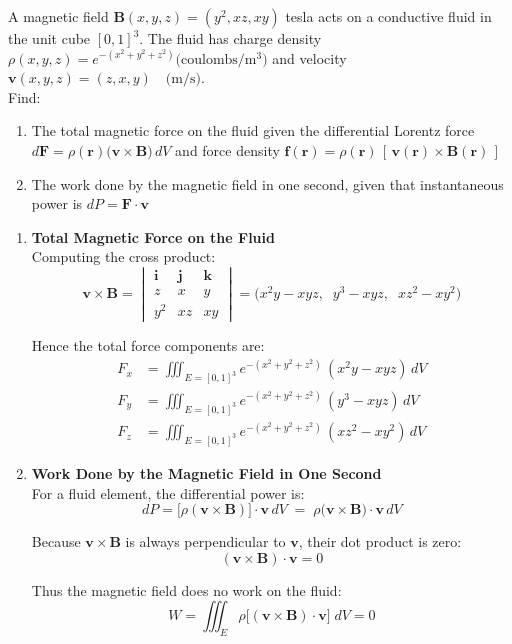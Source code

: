\exampleline
\begin{example}
A magnetic field $\mathbf{B}(x,y,z) = (y^2, xz, xy)$ tesla acts on a conductive fluid in the unit cube $[0,1]^3$. The fluid has charge density $\rho(x,y,z) = e^{-(x^2 + y^2 + z^2)}  \text{(coulombs/m$^3$)}$ and velocity $\mathbf{v}(x,y,z) = (z, x, y) \quad \text{(m/s)}$. \\

\noindent Find:
\begin{enumerate}
   \item The total magnetic force on the fluid given the differential Lorentz force $d\mathbf{F} =  \rho(\mathbf{r}) \bigl(\mathbf{v} \times \mathbf{B}\bigr)\,dV$ and force density $\mathbf{f}(\mathbf{r}) = \rho(\mathbf{r})\,[\,\mathbf{v}(\mathbf{r}) \times \mathbf{B}(\mathbf{r})\,]$
   \item The work done by the magnetic field in one second, given that instantaneous power is $dP = \mathbf{F}\cdot\mathbf{v}$
\end{enumerate}

\begin{solution}
\begin{enumerate}
   \item \textbf{Total Magnetic Force on the Fluid} \\
   
   Computing the cross product:
   \[
   \mathbf{v} \times \mathbf{B}
   =
   \begin{vmatrix}
   \mathbf{i} & \mathbf{j} & \mathbf{k}\\
   z & x & y\\
   y^2 & xz & xy
   \end{vmatrix}
   =
   \bigl(x^2y - xyz,\;\;y^3 - xyz,\;\;xz^2 - xy^2\bigr)
   \]
   
   Hence the total force components are:
   \begin{align*}
   F_x &= \iiint_{E=[0,1]^3} e^{-(x^2 + y^2 + z^2)}\,(x^2y - x y z)\, dV \\[1ex]
   F_y &= \iiint_{E=[0,1]^3} e^{-(x^2 + y^2 + z^2)}\,(y^3 - x y z)\, dV \\[1ex]
   F_z &= \iiint_{E=[0,1]^3} e^{-(x^2 + y^2 + z^2)}\,(x z^2 - x y^2)\, dV
   \end{align*}

   \item \textbf{Work Done by the Magnetic Field in One Second} \\
   
   For a fluid element, the differential power is:
   \[
   dP = \bigl[\rho(\mathbf{v}\times\mathbf{B})\bigr]\cdot\mathbf{v}\,dV 
   \;=\; \rho \bigl(\mathbf{v}\times\mathbf{B}\bigr)\cdot \mathbf{v}\, dV
   \]
   
   Because $\mathbf{v}\times\mathbf{B}$ is always perpendicular to $\mathbf{v}$, their dot product is zero:
   \[
   (\mathbf{v}\times\mathbf{B})\cdot\mathbf{v} = 0
   \]
   
   Thus the magnetic field does no work on the fluid:
   \[
   W = \iiint_{E} \rho \bigl[(\mathbf{v}\times\mathbf{B})\cdot\mathbf{v}\bigr]\; dV = 0
   \]
\end{enumerate}

\end{solution}
\end{example}
